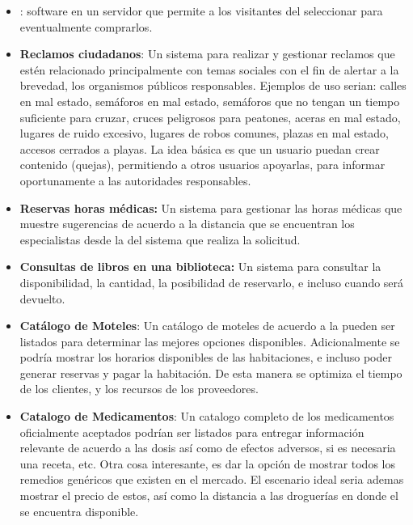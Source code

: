 \begin{itemize}
	\item \textbf{\shoppingCart}: \ecommerce software en un servidor \webINT que permite a los visitantes del \websiteINT seleccionar \itemsCOM para eventualmente comprarlos.
	
	\item \textbf{Reclamos ciudadanos}: Un sistema para realizar y gestionar reclamos que estén relacionado principalmente con temas sociales con el fin de alertar a la brevedad, los organismos públicos responsables. Ejemplos de uso serian: calles en mal estado, semáforos en mal estado, semáforos que no tengan un tiempo suficiente para cruzar, cruces peligrosos para peatones, aceras en mal estado, lugares de ruido excesivo, lugares de robos comunes, plazas en mal estado, accesos cerrados a playas. La idea básica es que un usuario puedan crear contenido (quejas), permitiendo a otros usuarios apoyarlas, para informar oportunamente a las autoridades responsables.
	
	\item \textbf{Reservas horas médicas:} Un sistema para gestionar las horas médicas que muestre sugerencias de acuerdo a la distancia que se encuentran los especialistas desde la \geoPositionCPT del sistema que realiza la solicitud. 
	
	\item \textbf{Consultas de libros en una biblioteca:} Un sistema para consultar la disponibilidad, la cantidad, la posibilidad de reservarlo, e incluso cuando será devuelto.
	\item \textbf{Catálogo de Moteles}: Un catálogo de moteles de acuerdo a la \geoPositionCPT pueden ser listados para determinar las mejores opciones disponibles. Adicionalmente se podría mostrar los horarios disponibles de las habitaciones, e incluso poder generar reservas y pagar la habitación. De esta manera se optimiza el tiempo de los clientes, y los recursos de los proveedores.
	
	\item \textbf{Catalogo de Medicamentos}: Un catalogo completo de los medicamentos oficialmente aceptados podrían ser listados para entregar información relevante de acuerdo a las dosis así como de efectos adversos, si es necesaria una receta, etc. Otra cosa interesante, es dar la opción de mostrar todos los remedios genéricos que existen en el mercado. El escenario ideal seria ademas mostrar el precio de estos, así como la distancia a las droguerías en donde el \itemCOM se encuentra disponible.
	

\end{itemize}
